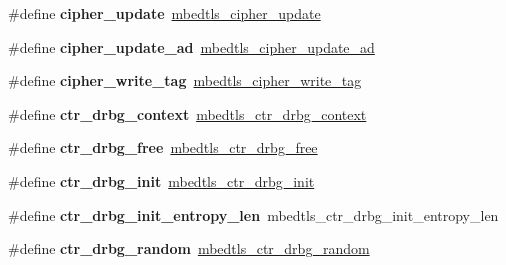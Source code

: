 \begin{DoxyCompactItemize}
\item 
\mbox{\label{compat-1_83_8h_aee784772aede4fb4b84d08a31c8435c3}} 
\#define {\bfseries cipher\+\_\+update}~\mbox{\hyperlink{cipher_8h_a959598dfef9d7f2add8861e0c518f303}{mbedtls\+\_\+cipher\+\_\+update}}
\item 
\mbox{\label{compat-1_83_8h_a070059270bab4b86a37e712f5874b113}} 
\#define {\bfseries cipher\+\_\+update\+\_\+ad}~\mbox{\hyperlink{cipher_8h_a86bc4ed42ff087c33bb00fe31b049ae7}{mbedtls\+\_\+cipher\+\_\+update\+\_\+ad}}
\item 
\mbox{\label{compat-1_83_8h_ad87904fc5940a09711b7051c231ff358}} 
\#define {\bfseries cipher\+\_\+write\+\_\+tag}~\mbox{\hyperlink{cipher_8h_a8916ddd18e94002913b80a6b04b83693}{mbedtls\+\_\+cipher\+\_\+write\+\_\+tag}}
\item 
\mbox{\label{compat-1_83_8h_ad456410300702ba4b63d390f900bbb47}} 
\#define {\bfseries ctr\+\_\+drbg\+\_\+context}~\mbox{\hyperlink{structmbedtls__ctr__drbg__context}{mbedtls\+\_\+ctr\+\_\+drbg\+\_\+context}}
\item 
\mbox{\label{compat-1_83_8h_a947fd56ccdad7fb5c88aaadc95f57f0f}} 
\#define {\bfseries ctr\+\_\+drbg\+\_\+free}~\mbox{\hyperlink{ctr__drbg_8h_a1ea42b9eb6f6b33c82359f4c0a57ca43}{mbedtls\+\_\+ctr\+\_\+drbg\+\_\+free}}
\item 
\mbox{\label{compat-1_83_8h_ae009468a657b5489450df42bef0b4445}} 
\#define {\bfseries ctr\+\_\+drbg\+\_\+init}~\mbox{\hyperlink{ctr__drbg_8h_a70dbec5e03601bf437ec488f2645743b}{mbedtls\+\_\+ctr\+\_\+drbg\+\_\+init}}
\item 
\mbox{\label{compat-1_83_8h_a7adf6c4780d4d384729f13ebed117864}} 
\#define {\bfseries ctr\+\_\+drbg\+\_\+init\+\_\+entropy\+\_\+len}~mbedtls\+\_\+ctr\+\_\+drbg\+\_\+init\+\_\+entropy\+\_\+len
\item 
\mbox{\label{compat-1_83_8h_aae6165e1fba059977940fd88ecafe60f}} 
\#define {\bfseries ctr\+\_\+drbg\+\_\+random}~\mbox{\hyperlink{ctr__drbg_8h_af6e4dd295ae790a33128562dd01c79ab}{mbedtls\+\_\+ctr\+\_\+drbg\+\_\+random}}
\item 
\mbox{\label{compat-1_83_8h_aa22703b62e552d8068a7b6702dd66d1c}} 

\end{DoxyCompactItemize}
